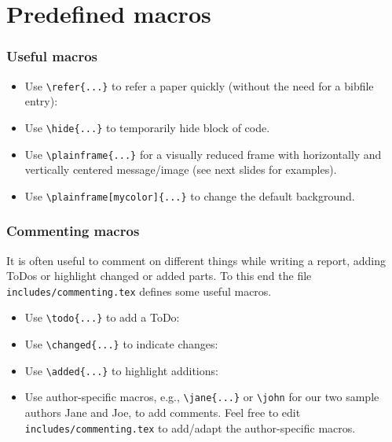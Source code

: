 \documentclass[t,english]{beamer}
\begin{document}

\section{Predefined macros}

\begin{frame}[fragile]
  \frametitle{Useful macros}

  \begin{itemize}
    \item Use \verb|\refer{...}| to refer a paper quickly (without the need for a bibfile entry): 
    \item Use \verb|\hide{...}| to temporarily hide block of code.
    \item Use \verb|\plainframe{...}| for a visually reduced frame with horizontally and vertically centered message/image (see next slides for examples).
    \item Use \verb|\plainframe[mycolor]{...}| to change the default background.
  \end{itemize}

\end{frame}

\plainframe{\textcolor{rwthdarkblue}{Plain slide (focus on certain element)}}


\begin{frame}[fragile]
  \frametitle{Commenting macros}
    
  It is often useful to comment on different things while writing a report, adding ToDos or highlight changed or added parts. To this end the file \texttt{includes/commenting.tex} defines some useful macros.
  \begin{itemize}
    \item Use \verb|\todo{...}| to add a ToDo:\newline {}
    \item Use \verb|\changed{...}| to indicate changes:\newline {}
    \item Use \verb|\added{...}| to highlight additions:\newline {}
    \item Use author-specific macros, e.g., \verb|\jane{...}| or \verb|\john| for our two sample authors Jane and Joe, to add comments. Feel free to edit \texttt{includes/commenting.tex} to add/adapt the author-specific macros.\newline{}
    \newline
  \end{itemize}
    
\end{frame}
\end{document}

